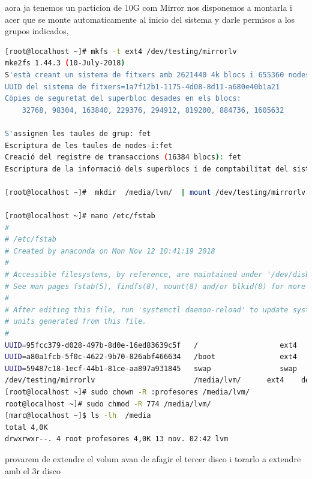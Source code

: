 \documentclass[preprint,11pt]{elsarticle}
\begin{document}
aora ja tenemos un particion de 10G com Mirror nos disponemos a montarla i acer que se monte automaticamente al inicio del sistema y darle permisos a los grupos indicados, 

\begin{lstlisting}[basicstyle=\tiny, language=bash]
[root@localhost ~]# mkfs -t ext4 /dev/testing/mirrorlv 
mke2fs 1.44.3 (10-July-2018)
S'està creant un sistema de fitxers amb 2621440 4k blocs i 655360 nodes-i
UUID del sistema de fitxers=1a7f12b1-1175-4d08-8d11-a680e40b1a21
Còpies de seguretat del superbloc desades en els blocs: 
	32768, 98304, 163840, 229376, 294912, 819200, 884736, 1605632

S'assignen les taules de grup: fet                            
Escriptura de les taules de nodes-i:fet                            
Creació del registre de transaccions (16384 blocs): fet
Escriptura de la informació dels superblocs i de comptabilitat del sistema de fitxers:fet  

[root@localhost ~]#  mkdir  /media/lvm/  | mount /dev/testing/mirrorlv  /media/lvm/ 

[root@localhost ~]# nano /etc/fstab 
#
# /etc/fstab
# Created by anaconda on Mon Nov 12 10:41:19 2018
#
# Accessible filesystems, by reference, are maintained under '/dev/disk/'.
# See man pages fstab(5), findfs(8), mount(8) and/or blkid(8) for more info.
#
# After editing this file, run 'systemctl daemon-reload' to update systemd
# units generated from this file.
#
UUID=95fcc379-d028-497b-8d0e-16ed83639c5f   /                   ext4    defaults        1 1
UUID=a80a1fcb-5f0c-4622-9b70-826abf466634   /boot               ext4    defaults        1 2
UUID=59487c18-1ecf-44b1-81ce-aa897a931845   swap                swap    defaults        0 0
/dev/testing/mirrorlv                       /media/lvm/      ext4    defaults        0 1
[root@localhost ~]# sudo chown -R :profesores /media/lvm/
root@localhost ~]# sudo chmod -R 774 /media/lvm/
[marc@localhost ~]$ ls -lh  /media
total 4,0K
drwxrwxr--. 4 root profesores 4,0K 13 nov. 02:42 lvm

\end{lstlisting}

provarem de extendre el volum avan de afagir el tercer disco i torarlo a extendre amb el 3r disco 
\end{document}
